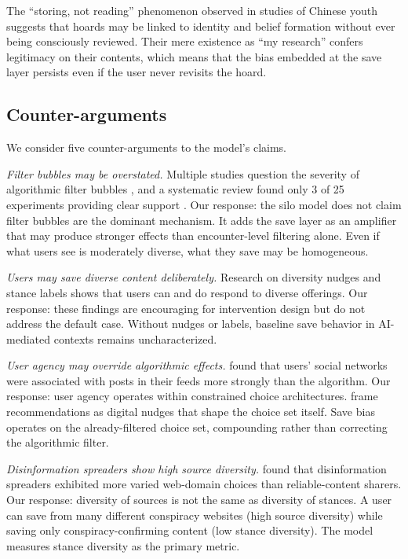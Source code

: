 \documentclass[12pt,a4paper]{article}
\begin{document}
The ``storing, not reading'' phenomenon observed in studies of Chinese youth \citep{Wang2023} suggests that hoards may be linked to identity and belief formation without ever being consciously reviewed.
Their mere existence as ``my research'' confers legitimacy on their contents, which means that the bias embedded at the save layer persists even if the user never revisits the hoard.


\subsection{Counter-arguments}

We consider five counter-arguments to the model's claims.

\emph{Filter bubbles may be overstated.}
Multiple studies question the severity of algorithmic filter bubbles \citep{Guess2023,Liu2025,Flaxman2016}, and a systematic review found only 3 of 25 experiments providing clear support \citep{Areeb2023}.
Our response: the silo model does not claim filter bubbles are the dominant mechanism.
It adds the save layer as an amplifier that may produce stronger effects than encounter-level filtering alone.
Even if what users see is moderately diverse, what they save may be homogeneous.

\emph{Users may save diverse content deliberately.}
Research on diversity nudges \citep{Yu2024} and stance labels \citep{Jiang2025} shows that users can and do respond to diverse offerings.
Our response: these findings are encouraging for intervention design but do not address the default case.
Without nudges or labels, baseline save behavior in AI-mediated contexts remains uncharacterized.

\emph{User agency may override algorithmic effects.}
\citet{GonzalezBailon2023} found that users' social networks were associated with posts in their feeds more strongly than the algorithm.
Our response: user agency operates within constrained choice architectures.
\citet{Jesse2021} frame recommendations as digital nudges that shape the choice set itself.
Save bias operates on the already-filtered choice set, compounding rather than correcting the algorithmic filter.

\emph{Disinformation spreaders show high source diversity.}
\citet{Bertani2024} found that disinformation spreaders exhibited more varied web-domain choices than reliable-content sharers.
Our response: diversity of sources is not the same as diversity of stances.
A user can save from many different conspiracy websites (high source diversity) while saving only conspiracy-confirming content (low stance diversity).
The model measures stance diversity as the primary metric.
\end{document}
